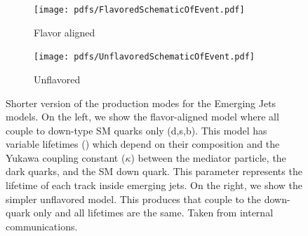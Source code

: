 \begin{figure}
	\centering
	\begin{subfigure}{.45\linewidth}
		\texttt{[image: pdfs/FlavoredSchematicOfEvent.pdf]}
		\caption{Flavor aligned}
		\label{fig:emj_prod2A}
	\end{subfigure}
	\begin{subfigure}{.45\linewidth}
		\texttt{[image: pdfs/UnflavoredSchematicOfEvent.pdf]}
		\caption{Unflavored}
	\end{subfigure}
	\caption[Shorter version of the production modes for the Emerging Jets models.]{Shorter version of the production modes for the Emerging Jets models. On the left, we show the flavor-aligned model where all \Qdark couple to down-type SM quarks only (d,s,b).
		This model has \pidark variable lifetimes (\ctaudpi ) which depend on their composition and the Yukawa coupling constant ($\kappa$) between the mediator particle, the dark quarks, and the SM down quark. This parameter represents the lifetime of each track inside emerging jets.
		On the right, we show the simpler unflavored model. This produces \Qdark that couple to the down-quark only and all \pidark lifetimes are the same. Taken from internal communications.}
	\label{fig:emj_production2}
\end{figure}


